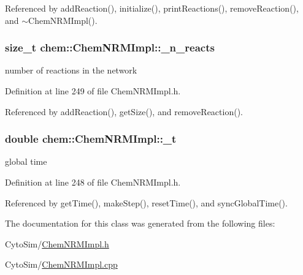 Referenced by add\-Reaction(), initialize(), print\-Reactions(), remove\-Reaction(), and $\sim$\-Chem\-N\-R\-M\-Impl().

\hypertarget{classchem_1_1ChemNRMImpl_a7e53992b28e926d1a19f3fd7dea171c3}{
\subsubsection[{\-\_\-n\-\_\-reacts}]{\setlength{\rightskip}{0pt plus 5cm}size\-\_\-t {\bf chem\-::\-Chem\-N\-R\-M\-Impl\-::\-\_\-n\-\_\-reacts}}}\label{classchem_1_1ChemNRMImpl_a7e53992b28e926d1a19f3fd7dea171c3}


number of reactions in the network 



Definition at line 249 of file Chem\-N\-R\-M\-Impl.\-h.



Referenced by add\-Reaction(), get\-Size(), and remove\-Reaction().

\hypertarget{classchem_1_1ChemNRMImpl_a1b14f424d72d3c5b0aafe31d7b7c4f82}{
\subsubsection[{\-\_\-t}]{\setlength{\rightskip}{0pt plus 5cm}double {\bf chem\-::\-Chem\-N\-R\-M\-Impl\-::\-\_\-t}}}\label{classchem_1_1ChemNRMImpl_a1b14f424d72d3c5b0aafe31d7b7c4f82}


global time 



Definition at line 248 of file Chem\-N\-R\-M\-Impl.\-h.



Referenced by get\-Time(), make\-Step(), reset\-Time(), and sync\-Global\-Time().



The documentation for this class was generated from the following files\-:\begin{DoxyCompactItemize}
\item 
Cyto\-Sim/\hyperlink{ChemNRMImpl_8h}{Chem\-N\-R\-M\-Impl.\-h}\item 
Cyto\-Sim/\hyperlink{ChemNRMImpl_8cpp}{Chem\-N\-R\-M\-Impl.\-cpp}\end{DoxyCompactItemize}
